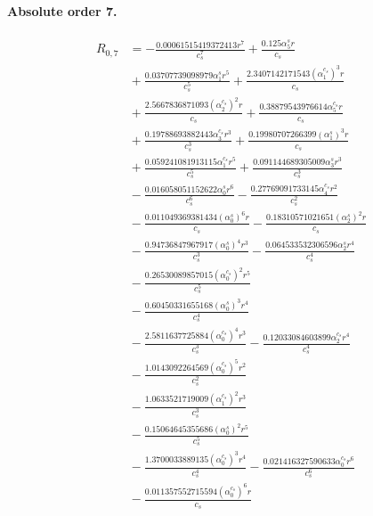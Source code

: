 \documentclass[10pt]{article}
\begin{document}
\paragraph{Absolute order 7.}
\begin{align*}
R_{0,7} &=  - \frac{0.00061515419372413 r^{7}}{c_{s}^{7}} + \frac{0.125 \alpha_{5}^s r}{c_{s}} \\
&{}  + \frac{0.03707739098979 \alpha_{1}^s r^{5}}{c_{s}^{5}} + \frac{2.3407142171543 \left(\alpha_{1}^{c_s}\right)^{3} r}{c_{s}} \\
&{}  + \frac{2.5667836871093 \left(\alpha_{2}^{c_s}\right)^{2} r}{c_{s}} + \frac{0.38879543976614 \alpha_{5}^{c_s} r}{c_{s}} \\
&{}  + \frac{0.19788693882443 \alpha_{3}^{c_s} r^{3}}{c_{s}^{3}} + \frac{0.19980707266399 \left(\alpha_{1}^s\right)^{3} r}{c_{s}} \\
&{}  + \frac{0.059241081913115 \alpha_{1}^{c_s} r^{5}}{c_{s}^{5}} + \frac{0.091144689305009 \alpha_{3}^s r^{3}}{c_{s}^{3}} \\
&{}  - \frac{0.016058051152622 \alpha_{0}^s r^{6}}{c_{s}^{6}} - \frac{0.27769091733145 \alpha_{4}^{c_s} r^{2}}{c_{s}^{2}} \\
&{}  - \frac{0.011049369381434 \left(\alpha_{0}^s\right)^{6} r}{c_{s}} - \frac{0.18310571021651 \left(\alpha_{2}^s\right)^{2} r}{c_{s}} \\
&{}  - \frac{0.94736847967917 \left(\alpha_{0}^s\right)^{4} r^{3}}{c_{s}^{3}} - \frac{0.064533532306596 \alpha_{2}^s r^{4}}{c_{s}^{4}} \\
&{}  - \frac{0.26530089857015 \left(\alpha_{0}^{c_s}\right)^{2} r^{5}}{c_{s}^{5}} \\
&{}  - \frac{0.60450331655168 \left(\alpha_{0}^s\right)^{3} r^{4}}{c_{s}^{4}} \\
&{}  - \frac{2.5811637725884 \left(\alpha_{0}^{c_s}\right)^{4} r^{3}}{c_{s}^{3}} - \frac{0.12033084603899 \alpha_{2}^{c_s} r^{4}}{c_{s}^{4}} \\
&{}  - \frac{1.0143092264569 \left(\alpha_{0}^{c_s}\right)^{5} r^{2}}{c_{s}^{2}} \\
&{}  - \frac{1.0633521719009 \left(\alpha_{1}^{c_s}\right)^{2} r^{3}}{c_{s}^{3}} \\
&{}  - \frac{0.15064645355686 \left(\alpha_{0}^s\right)^{2} r^{5}}{c_{s}^{5}} \\
&{}  - \frac{1.3700033889135 \left(\alpha_{0}^{c_s}\right)^{3} r^{4}}{c_{s}^{4}} - \frac{0.021416327590633 \alpha_{0}^{c_s} r^{6}}{c_{s}^{6}} \\
&{}  - \frac{0.011357552715594 \left(\alpha_{0}^{c_s}\right)^{6} r}{c_{s}} \\

\end{align*}
\end{document}
